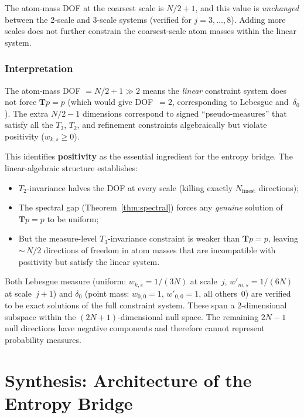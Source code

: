 \documentclass[11pt,a4paper]{article}
\begin{document}
The atom-mass DOF at the coarsest scale is $N/2 + 1$,
and this value is \emph{unchanged} between the 2-scale and 3-scale
systems (verified for $j = 3, \ldots, 8$).
Adding more scales does not further constrain the coarsest-scale
atom masses within the linear system.

\subsubsection*{Interpretation}

The atom-mass DOF $= N/2 + 1 \gg 2$ means the \emph{linear} constraint
system does not force $\mathbf{T}p = p$ (which would give DOF~$= 2$,
corresponding to Lebesgue and~$\delta_0$).
The extra $N/2 - 1$ dimensions correspond to signed
``pseudo-measures'' that satisfy all the $T_3$, $T_2$, and refinement
constraints algebraically but violate positivity ($w_{k,s} \ge 0$).

This identifies \textbf{positivity} as the essential ingredient for the
entropy bridge.
The linear-algebraic structure establishes:
\begin{itemize}
\item $T_2$-invariance halves the DOF at every scale
  (killing exactly $N_{\text{finest}}$ directions);
\item The spectral gap (Theorem~\ref{thm:spectral}) forces any
  \emph{genuine} solution of $\mathbf{T}p = p$ to be uniform;
\item But the measure-level $T_3$-invariance constraint is weaker than
  $\mathbf{T}p = p$, leaving ${\sim}\,N/2$ directions of freedom
  in atom masses that are incompatible with positivity but satisfy
  the linear system.
\end{itemize}

Both Lebesgue measure (uniform: $w_{k,s} = 1/(3N)$ at scale~$j$,
$w'_{m,s} = 1/(6N)$ at scale~$j+1$) and $\delta_0$ (point mass:
$w_{0,0} = 1$, $w'_{0,0} = 1$, all others~$0$) are verified to
be exact solutions of the full constraint system.
These span a 2-dimensional subspace within the $(2N+1)$-dimensional
null space.
The remaining $2N - 1$ null directions have negative components
and therefore cannot represent probability measures.


\section{Synthesis: Architecture of the Entropy Bridge}
\end{document}
